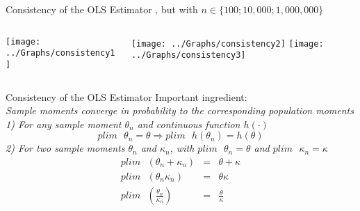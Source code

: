 \begin{frame}{Consistency of the OLS Estimator}
, but with $n \in \{ 100; 10,000; 1,000,000 \}$
\begin{columns}[T]
\begin{column}{0.5\textwidth}
\begin{center}
\texttt{[image: ../Graphs/consistency1]}
\end{center}
\end{column}
\begin{column}{0.5\textwidth}
\begin{center}
\texttt{[image: ../Graphs/consistency2]}
\texttt{[image: ../Graphs/consistency3]}
\end{center}
\end{column}
\end{columns}
\end{frame}


\begin{frame}{Consistency of the OLS Estimator}
Important ingredient: \\
\textit{Sample moments converge in probability to the corresponding population moments}
\vfill
\pause
{}\\
\textit{1) For any sample moment $\theta_n$ and continuous function $h(\cdot)$}
\begin{equation}
plim \mbox{  }  \theta_n = \theta \Rightarrow plim\mbox{  } h(\theta_n)=h(\theta)
\label{eq24}
\end{equation}
\vfill
\textit{2) For two sample moments $\theta_n$ and $\kappa_n$, with $plim \mbox{  }  \theta_n = \theta$ and $plim \mbox{  }  \kappa_n = \kappa$}
\begin{eqnarray}
plim \mbox{  }  (\theta_n+ \kappa_n)&=&\theta + \kappa \nonumber \\
plim\mbox{  }   (\theta_n\kappa_n)&=&\theta \kappa \\
plim \mbox{  }  (\frac{\theta_n}{\kappa_n})&=&\frac{\theta}{\kappa} \nonumber 
\label{eq25}
\end{eqnarray}
\end{frame}


